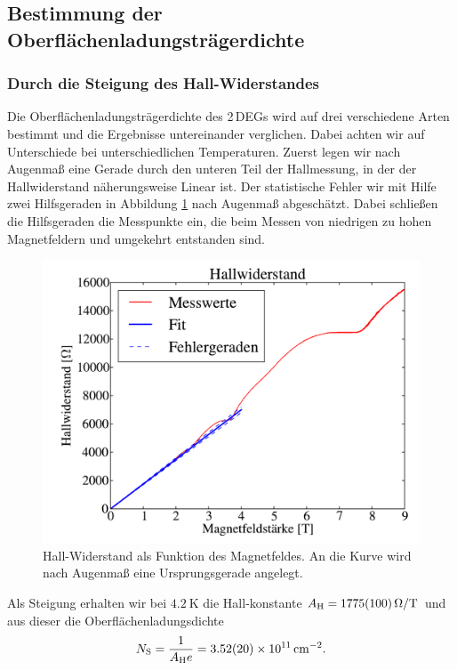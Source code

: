 \documentclass[paper=a4,fontsize=10pt,DIV=18,twocolumn,parskip=half]{scrartcl}
\numberwithin{equation}{section}    %
\begin{document}
\subsection{Bestimmung der Oberflächenladungsträgerdichte}
\label{a2}
\subsubsection*{Durch die Steigung des Hall-Widerstandes}
Die Oberflächenladungsträgerdichte des 2\,DEGs wird auf drei verschiedene Arten bestimmt und die Ergebnisse untereinander verglichen. Dabei achten wir auf Unterschiede bei unterschiedlichen Temperaturen. Zuerst legen wir nach Augenmaß eine Gerade durch den unteren Teil der Hallmessung, in der der Hallwiderstand näherungsweise Linear ist. Der statistische Fehler wir mit Hilfe zwei Hilfsgeraden in Abbildung \ref{hallsteigung} nach Augenmaß abgeschätzt. Dabei schließen die Hilfsgeraden die Messpunkte ein, die beim Messen von niedrigen zu hohen Magnetfeldern und umgekehrt entstanden sind. 
\begin{figure}[htp]
	\begin{center}
		\includegraphics[width=\columnwidth]{Data-Plots/02-Hallsteigung.pdf}
		\caption{Hall-Widerstand als Funktion des Magnetfeldes. An die Kurve wird nach Augenmaß eine Ursprungsgerade angelegt.}
		\label{hallsteigung}
	\end{center}
\end{figure}
Als Steigung erhalten wir bei $\SI{4.2}{\kelvin}$ die Hall-konstante $A_{\rm H}=\SI[per-mode=symbol]{1775(100)}{\ohm\per\tesla}$ und aus dieser die Oberflächenladungsdichte
\begin{equation}
N_{\rm S}=\frac{1}{A_{\rm H} e} = \SI{3.52(20)e11}{\per\square\centi\meter}.
\label{ns1}
\end{equation}
\end{document}
